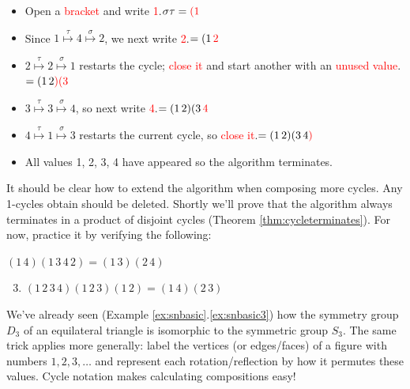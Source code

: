 \begin{itemize}\itemsep0pt
  \item Open a \textcolor{red}{bracket} and write \textcolor{red}{1}.\hfill $\sigma\tau=\textcolor{red}{(1}\phantom{\,2)(3\,4)}$
  \item Since $1\overset{\tau}{\mapsto}4\overset{\sigma}{\mapsto}2$, we next write \textcolor{red}{2}.\hfill $=(1\,\textcolor{red}{2}\phantom{)(3\,4)}$
  \item $2\overset{\tau}{\mapsto}2\overset{\sigma}{\mapsto}1$ restarts the cycle; \textcolor{red}{close it} and start another with an \textcolor{red}{unused value}.\hfill $=(1\,2\textcolor{red}{)(3}\phantom{\,4)}$
  \item $3\overset{\tau}{\mapsto}3\overset{\sigma}{\mapsto}4$, so next write \textcolor{red}{4}.\hfill $=(1\,2)(3\,\textcolor{red}{4}\phantom{)}$
  \item $4\overset{\tau}{\mapsto}1\overset{\sigma}{\mapsto}3$ restarts the current cycle, so \textcolor{red}{close it}.\hfill $=(1\,2)(3\,4\textcolor{red}{)}$
  \item All values 1, 2, 3, 4 have appeared so the algorithm terminates.
\end{itemize}
It should be clear how to extend the algorithm when composing more cycles. Any 1-cycles obtain should be deleted. Shortly we'll prove that the algorithm always terminates in a product of disjoint cycles (Theorem \ref{thm:cycleterminates}). For now, practice it by verifying the following:

\begin{examples}{}{}
	\exstart $(1\,4)(1\,3\,4\,2)=(1\,3)(2\,4)$\hfill {}
	\begin{enumerate}\setcounter{enumi}{2}
	  \item $(1\,2\,3\,4)(1\,2\,3)(1\,2)=(1\,4)(2\,3)$\hfill {}
	\end{enumerate}
\end{examples}


\goodbreak



We've already seen (Example \ref*{ex:snbasic}.\ref{ex:snbasic3}) how the symmetry group $D_3$ of an equilateral triangle is isomorphic to the symmetric group $S_3$. The same trick applies more generally: label the vertices (or edges/faces) of a figure with numbers $1,2,3,\ldots$ and represent each rotation/reflection by how it permutes these values. Cycle notation makes calculating compositions easy!

